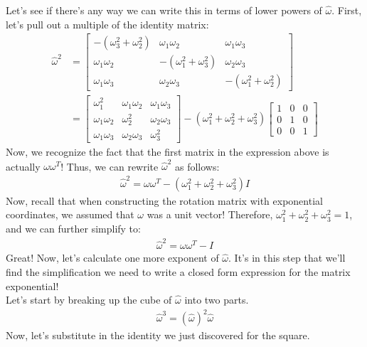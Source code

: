 \documentclass[oneside]{book}
\begin{document}
Let's see if there's any way we can write this in terms of lower powers of $\hat\omega$. First, let's pull out a multiple of the identity matrix:
\begin{align}
    \hat{\omega}^2 &= 
    \begin{bmatrix}
    -(\omega_3^2 + \omega_2^2) & \omega_1\omega_2 & \omega_1\omega_3\\
    \omega_1\omega_2 &  -(\omega_1^2 + \omega_3^2) & \omega_2\omega_3\\
    \omega_1\omega_3 & \omega_2\omega_3 &  -(\omega_1^2 + \omega_2^2)
    \end{bmatrix}\\
     &= 
    \begin{bmatrix}
    \omega_1^2 & \omega_1\omega_2 & \omega_1\omega_3\\
    \omega_1\omega_2 &  \omega_2^2 & \omega_2\omega_3\\
    \omega_1\omega_3 & \omega_2\omega_3 & \omega_3^2
    \end{bmatrix}
    - (\omega_1^2 + \omega_2^2 + \omega_3^2)
    \begin{bmatrix}
    1 & 0 & 0\\
    0 & 1 & 0\\
    0 & 0 & 1
    \end{bmatrix}
\end{align}
Now, we recognize the fact that the first matrix in the expression above is actually $\omega\omega^T$! Thus, we can rewrite $ \hat{\omega}^2$ as follows:
\begin{align}
     \hat{\omega}^2 = \omega\omega^T - (\omega_1^2 + \omega_2^2 + \omega_3^2)I
\end{align}
Now, recall that when constructing the rotation matrix with exponential coordinates, we assumed that $\omega$ was a unit vector! Therefore, $\omega_1^2 + \omega_2^2 + \omega_3^2 = 1$, and we can further simplify to:
\begin{align}
    \hat{\omega}^2 = \omega\omega^T - I
\end{align}
Great! Now, let's calculate one more exponent of $\hat\omega$. It's in this step that we'll find the simplification we need to write a closed form expression for the matrix exponential!\\
Let's start by breaking up the cube of $\hat\omega$ into two parts.
\begin{align}
    \hat\omega^3 = (\hat{\omega})^2\hat\omega
\end{align}
Now, let's substitute in the identity we just discovered for the square.
\end{document}
